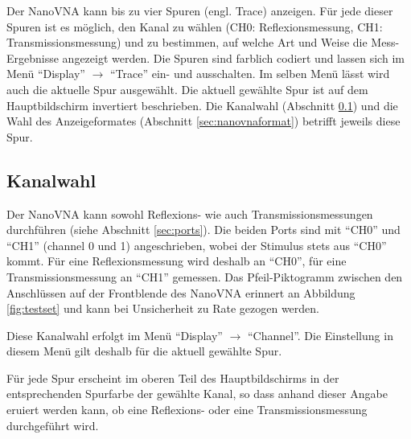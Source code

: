 \documentclass[twoside,a4paper,11pt,halfparskip,DIV=11,notitlepage]{scrartcl}
\begin{document}
Der NanoVNA kann bis zu vier Spuren (engl. Trace) anzeigen. Für jede dieser Spuren
ist es möglich, den Kanal zu wählen (CH0: Reflexionsmessung, CH1:
Transmissionsmessung) und zu bestimmen, auf welche Art und Weise die Mess-Ergebnisse
angezeigt werden. Die Spuren sind farblich codiert und lassen sich im Menü
``Display'' $\longrightarrow$ ``Trace'' ein- und ausschalten. Im selben Menü
lässt wird auch die aktuelle Spur ausgewählt. Die aktuell gewählte Spur ist auf dem
Hauptbildschirm invertiert beschrieben. Die Kanalwahl (Abschnitt
\ref{sec:nanovnachannel}) und die Wahl des Anzeigeformates (Abschnitt \ref{sec:nanovnaformat})
betrifft jeweils diese Spur.

\subsection{Kanalwahl}\label{sec:nanovnachannel}
\begin{center}\end{center}


Der NanoVNA kann sowohl Reflexions- wie auch Transmissionsmessungen durchführen
(siehe Abschnitt \ref{sec:ports}). Die beiden Ports sind mit ``CH0'' und ``CH1''
(channel 0 und 1) angeschrieben, wobei der Stimulus stets aus ``CH0'' kommt.
Für eine Reflexionsmessung wird deshalb an ``CH0'', für eine Transmissionsmessung
an ``CH1'' gemessen. Das Pfeil-Piktogramm zwischen den Anschlüssen auf der
Frontblende des NanoVNA erinnert an Abbildung \ref{fig:testset}
und kann bei Unsicherheit zu Rate gezogen werden.

Diese Kanalwahl erfolgt im Menü ``Display'' $\longrightarrow$ ``Channel''.
Die Einstellung in diesem Menü gilt deshalb für die aktuell gewählte Spur.

Für jede Spur erscheint im oberen Teil des Hauptbildschirms in der
entsprechenden Spurfarbe der gewählte Kanal, so dass anhand dieser Angabe
eruiert werden kann, ob eine Reflexions- oder eine Transmissionsmessung
durchgeführt wird.
\end{document}
